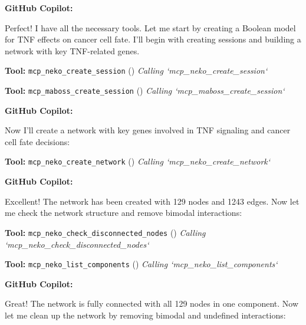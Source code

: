 \documentclass[11pt,a4paper]{article}
\begin{document}
\begin{copilotbox}
\textbf{GitHub Copilot:}

Perfect! I have all the necessary tools. Let me start by creating a Boolean model for TNF effects on cancer cell fate. I'll begin with creating sessions and building a network with key TNF-related genes.

\end{copilotbox}
\begin{toolokbox}
\textbf{Tool:} \texttt{mcp\_neko\_create\_session} (\checkmark)
\textit{Calling `mcp\_neko\_create\_session`}
\end{toolokbox}
\begin{toolokbox}
\textbf{Tool:} \texttt{mcp\_maboss\_create\_session} (\checkmark)
\textit{Calling `mcp\_maboss\_create\_session`}
\end{toolokbox}
\begin{copilotbox}
\textbf{GitHub Copilot:}

Now I'll create a network with key genes involved in TNF signaling and cancer cell fate decisions:

\end{copilotbox}
\begin{toolokbox}
\textbf{Tool:} \texttt{mcp\_neko\_create\_network} (\checkmark)
\textit{Calling `mcp\_neko\_create\_network`}
\end{toolokbox}
\begin{copilotbox}
\textbf{GitHub Copilot:}

Excellent! The network has been created with 129 nodes and 1243 edges. Now let me check the network structure and remove bimodal interactions:

\end{copilotbox}
\begin{toolokbox}
\textbf{Tool:} \texttt{mcp\_neko\_check\_disconnected\_nodes} (\checkmark)
\textit{Calling `mcp\_neko\_check\_disconnected\_nodes`}
\end{toolokbox}
\begin{toolokbox}
\textbf{Tool:} \texttt{mcp\_neko\_list\_components} (\checkmark)
\textit{Calling `mcp\_neko\_list\_components`}
\end{toolokbox}
\begin{copilotbox}
\textbf{GitHub Copilot:}

Great! The network is fully connected with all 129 nodes in one component. Now let me clean up the network by removing bimodal and undefined interactions:

\end{copilotbox}
\end{document}
